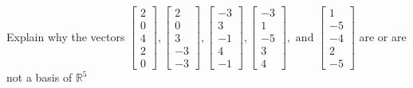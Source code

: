 \documentclass{article}
\begin{document}
\begin{exerciseStatement}
    Explain why the vectors \(\left[\begin{array}{r}
2 \\
0 \\
4 \\
2 \\
0
\end{array}\right] , \left[\begin{array}{r}
2 \\
0 \\
3 \\
-3 \\
-3
\end{array}\right] , \left[\begin{array}{r}
-3 \\
3 \\
-1 \\
4 \\
-1
\end{array}\right] , \left[\begin{array}{r}
-3 \\
1 \\
-5 \\
3 \\
4
\end{array}\right] , \text{ and } \left[\begin{array}{r}
1 \\
-5 \\
-4 \\
2 \\
-5
\end{array}\right]\) are or are not a basis of \(\mathbb{R}^5\)


  
\end{exerciseStatement}
\end{document}
